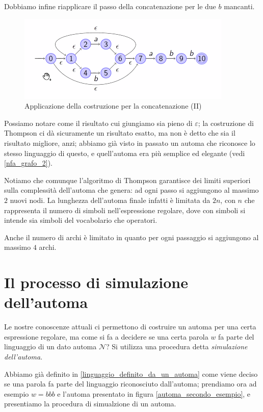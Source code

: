 \documentclass[class=book, crop=false, oneside, 12pt]{standalone}
\begin{document}
\noindent Dobbiamo infine riapplicare il passo della concatenazione per le due \(b\) mancanti.

\begin{figure}
    \centering
    \includegraphics[width=.5\textwidth,keepaspectratio]{esempio_Thompson_4}
    \caption{Applicazione della costruzione per la concatenazione (II)}
    \label{esempio_Thompson_4}
\end{figure}

Possiamo notare come il risultato cui giungiamo sia pieno di \(\varepsilon\); la costruzione di Thompson ci dà sicuramente un risultato esatto, ma non è detto che sia il risultato migliore, anzi; abbiamo già visto in passato un automa che riconosce lo stesso linguaggio di questo, e quell'automa era più semplice ed elegante (vedi \ref{nfa_grafo_2}).

Notiamo che comunque l’algoritmo di Thompson garantisce dei limiti superiori sulla complessità dell’automa che genera: ad ogni passo si aggiungono al massimo \(2\) nuovi nodi.
La lunghezza dell’automa finale infatti è limitata da \(2n\), con \(n\) che rappresenta il numero di simboli nell’espressione regolare, dove con simboli si intende sia simboli del vocabolario che operatori.

Anche il numero di archi è limitato in quanto per ogni passaggio si aggiungono al massimo \(4\) archi.

\section{Il processo di simulazione dell’automa}
Le nostre conoscenze attuali ci permettono di costruire un automa per una certa espressione regolare, ma come si fa a decidere se una certa parola \(w\) fa parte del linguaggio di un dato automa \(\mathcal{N}\)? Si utilizza una procedura detta \emph{simulazione dell’automa}.

Abbiamo già definito in \ref{linguaggio_definito_da_un_automa} come viene deciso se una parola fa parte del linguaggio riconosciuto dall’automa; prendiamo ora ad esempio \(w = bbb\) e l’automa presentato in figura \ref{automa_secondo_esempio}, e presentiamo la procedura di simualzione di un automa.
\end{document}
